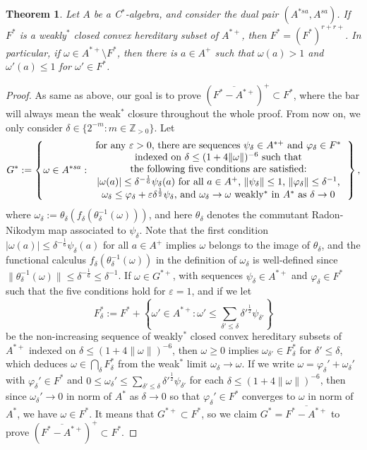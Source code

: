\documentclass[noamsfonts,a4paper,10pt]{amsart}
\theoremstyle{plain}
\newtheorem{thm}{Theorem}[section]
\theoremstyle{definition}
\theoremstyle{remark}
\begin{document}
\begin{thm}\label{2.4}
Let $A$ be a C$^*$-algebra, and consider the dual pair $(A^{*sa},A^{sa})$.
If $F^*$ is a weakly$^*$ closed convex hereditary subset of $A^{*+}$, then $F^*=(F^*)^{r+r+}$. In particular, if $\omega\in A^{*+}\setminus F^*$, then there is $a\in A^+$ such that $\omega(a)>1$ and $\omega'(a)\le1$ for $\omega'\in F^*$.
\end{thm}
\begin{proof}
As same as above, our goal is to prove $(\overline{F^*-A^{*+}})^+\subset F^*$, where the bar will always mean the weak$^*$ closure throughout the whole proof.
From now on, we only consider $\delta\in\{2^{-m}:m\in\mathbb{Z}_{>0}\}$.
Let
\[G^*:=\left\{\omega\in A^{*sa}:\begin{tabular}{c}
for any $\varepsilon>0$, there are sequences $\psi_\delta\in A^{*+}$ and $\varphi_\delta\in F^*$\\
indexed on $\delta\le(1+4\|\omega\|)^{-6}$ such that\\
the following five conditions are satisfied:\\
 $|\omega(a)|\le\delta^{-\frac16}\psi_\delta(a)$ for all $a\in A^+$, $\|\psi_\delta\|\le1$, $\|\varphi_\delta\|\le\delta^{-1}$,\\
$\omega_\delta\le\varphi_\delta+\varepsilon\delta^{\frac12}\psi_\delta$, and $\omega_\delta\to\omega$ weakly$^*$ in $A^*$ as $\delta\to0$
\end{tabular}\right\},\]
where $\omega_\delta:=\theta_\delta(f_\delta(\theta_\delta^{-1}(\omega)))$, and here $\theta_\delta$ denotes the commutant Radon-Nikodym map associated to $\psi_\delta$.
Note that the first condition $|\omega(a)|\le\delta^{-\frac16}\psi_\delta(a)$ for all $a\in A^+$ implies $\omega$ belongs to the image of $\theta_\delta$, and the functional calculus $f_\delta(\theta_\delta^{-1}(\omega))$ in the definition of $\omega_\delta$ is well-defined since $\|\theta_\delta^{-1}(\omega)\|\le\delta^{-\frac16}\le\delta^{-1}$.
If $\omega\in G^{*+}$, with sequences $\psi_\delta\in A^{*+}$ and $\varphi_\delta\in F^*$ such that the five conditions hold for $\varepsilon=1$, and if we let
\[F^*_\delta:=F^*+\left\{\omega'\in A^{*+}:\omega'\le\sum_{\delta'\le\delta}\delta'^{\frac12}\psi_{\delta'}\right\}\]
be the non-increasing sequence of weakly$^*$ closed convex hereditary subsets of $A^{*+}$ indexed on $\delta\le(1+4\|\omega\|)^{-6}$, then $\omega\ge0$ implies $\omega_{\delta'}\in F^*_\delta$ for $\delta'\le\delta$, which deduces $\omega\in\bigcap_\delta F_\delta^*$ from the weak$^*$ limit $\omega_\delta\to\omega$.
If we write $\omega=\varphi_\delta'+\omega_\delta'$ with $\varphi_\delta'\in F^*$ and $0\le\omega_\delta'\le\sum_{\delta'\le\delta}\delta'^{\frac12}\psi_{\delta'}$ for each $\delta\le(1+4\|\omega\|)^{-6}$, then since $\omega_\delta'\to0$ in norm of $A^*$ as $\delta\to0$ so that $\varphi_\delta'\in F^*$ converges to $\omega$ in norm of $A^*$, we have $\omega\in F^*$.
It means that $G^{*+}\subset F^*$, so we claim $G^*=\overline{F^*-A^{*+}}$ to prove $(\overline{F^*-A^{*+}})^+\subset F^*$.


\end{proof}
\end{document}
